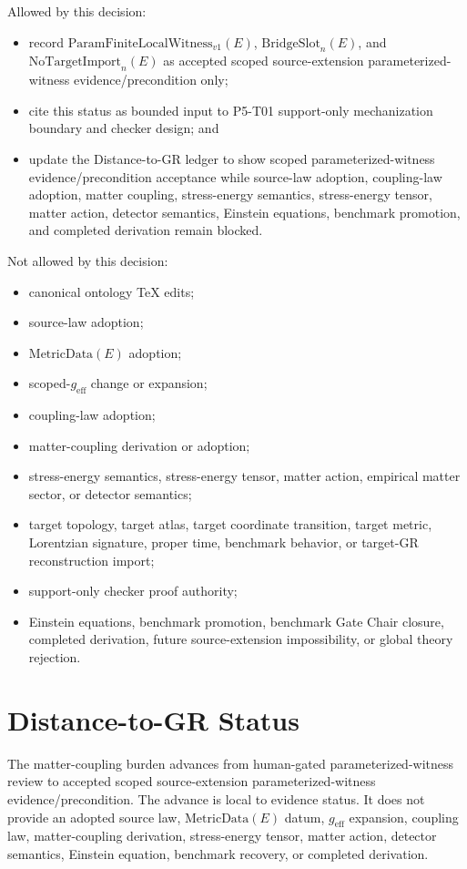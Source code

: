 \documentclass[11pt]{article}
\newcommand{\MetricData}{\mathrm{MetricData}}
\newcommand{\geff}{g_{\mathrm{eff}}}
\newcommand{\ParamWitness}{\mathrm{ParamFiniteLocalWitness}_{v1}}
\newcommand{\BridgeSlot}{\mathrm{BridgeSlot}_{n}}
\newcommand{\NoTargetImport}{\mathrm{NoTargetImport}_{n}}
\begin{document}
Allowed by this decision:
\begin{itemize}[leftmargin=*]
  \item record \(\ParamWitness(E)\), \(\BridgeSlot(E)\), and
  \(\NoTargetImport(E)\) as accepted scoped source-extension
  parameterized-witness evidence/precondition only;
  \item cite this status as bounded input to P5-T01 support-only mechanization
  boundary and checker design; and
  \item update the Distance-to-GR ledger to show scoped parameterized-witness
  evidence/precondition acceptance while source-law adoption, coupling-law
  adoption, matter coupling, stress-energy semantics, stress-energy tensor,
  matter action, detector semantics, Einstein equations, benchmark promotion,
  and completed derivation remain blocked.
\end{itemize}

Not allowed by this decision:
\begin{itemize}[leftmargin=*]
  \item canonical ontology TeX edits;
  \item source-law adoption;
  \item \(\MetricData(E)\) adoption;
  \item scoped-\(\geff\) change or expansion;
  \item coupling-law adoption;
  \item matter-coupling derivation or adoption;
  \item stress-energy semantics, stress-energy tensor, matter action,
  empirical matter sector, or detector semantics;
  \item target topology, target atlas, target coordinate transition, target
  metric, Lorentzian signature, proper time, benchmark behavior, or target-GR
  reconstruction import;
  \item support-only checker proof authority;
  \item Einstein equations, benchmark promotion, benchmark Gate Chair closure,
  completed derivation, future source-extension impossibility, or global
  theory rejection.
\end{itemize}

\section{Distance-to-GR Status}

The matter-coupling burden advances from human-gated parameterized-witness
review to accepted scoped source-extension parameterized-witness
evidence/precondition. The advance is local to evidence status. It does not
provide an adopted source law, \(\MetricData(E)\) datum, \(\geff\) expansion,
coupling law, matter-coupling derivation, stress-energy tensor, matter action,
detector semantics, Einstein equation, benchmark recovery, or completed
derivation.
\end{document}
